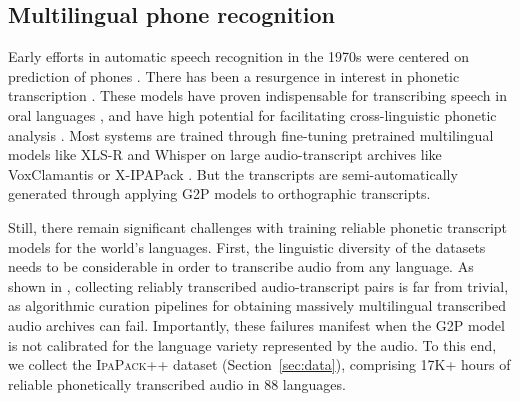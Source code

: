 \documentclass[11pt]{article}
\begin{document}
\subsection{Multilingual phone recognition}
Early efforts in automatic speech recognition in the 1970s were centered on prediction of phones \citep{li2017divination}. %
There has been a resurgence in interest in phonetic transcription \citep{li2020universal, gao2021zero, xu22b_interspeech, taguchi23_interspeech, glocker23_interspeech, samir2024efficiently}. These models have proven indispensable for transcribing speech in oral languages \citep{lane2021local}, and have high potential for facilitating cross-linguistic phonetic analysis \citep{chodroff-etal-2024-phonetic}. 
Most systems are trained through fine-tuning pretrained multilingual models like XLS-R and Whisper \citep{babu2021xls,radford2023robust} on large audio-transcript archives like VoxClamantis \citep[e.g.,][]{salesky-etal-2020-corpus} or X-IPAPack \citep{samir2024efficiently}. But the transcripts are semi-automatically generated through applying G2P models to orthographic transcripts.  

Still, there remain significant challenges with training reliable phonetic transcript models for the world's languages. First, the linguistic diversity of the datasets needs to be considerable in order to transcribe audio from any language. As shown in \citet{samir2024efficiently}, collecting reliably transcribed audio-transcript pairs is far from trivial, as algorithmic curation pipelines for obtaining massively multilingual transcribed audio archives can fail. Importantly, these failures manifest when the G2P model is not calibrated for the language variety represented by the audio. To this end, we collect the \textsc{IpaPack++} dataset (Section~\ref{sec:data}), comprising 17K+ hours of reliable phonetically transcribed audio in 88 languages.
\end{document}
